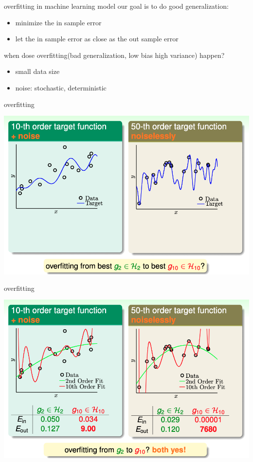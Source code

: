 \documentclass[
  ignorenonframetext,
]{beamer}
\begin{document}
\begin{frame}{overfitting}
in machine learning model our goal is to do good generalization:
\begin{itemize}
  \item minimize the in sample error
  \item let the in sample error as close as the out sample error
\end{itemize}
when dose overfitting(bad generalization, low bias high variance) happen?
\begin{itemize}
  \item small data size
  \item noise: stochastic, deterministic
\end{itemize}
\end{frame}


\begin{frame}{overfitting}
  \begin{center}
    \includegraphics{figure/pdf/overfitting1.png}
  \end{center}
\end{frame}


\begin{frame}{overfitting}
  \begin{center}
    \includegraphics{figure/pdf/overfitting2.png}
  \end{center}
\end{frame}
\end{document}
